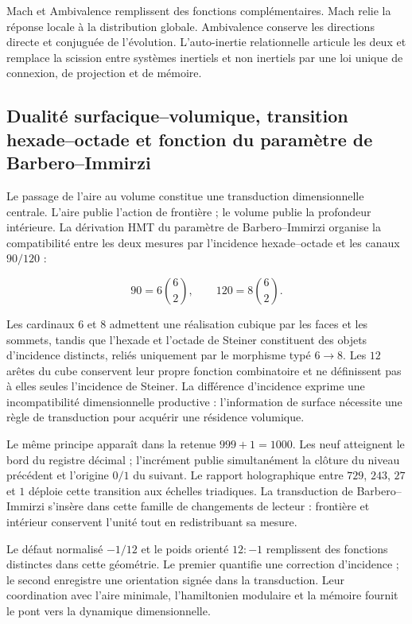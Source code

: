 Mach et Ambivalence remplissent des fonctions complémentaires. Mach relie la réponse locale à la distribution globale. Ambivalence conserve les directions directe et conjuguée de l'évolution. L'auto-inertie relationnelle articule les deux et remplace la scission entre systèmes inertiels et non inertiels par une loi unique de connexion, de projection et de mémoire.

\subsection{Dualité surfacique--volumique, transition hexade--octade et fonction du paramètre de Barbero--Immirzi}

Le passage de l'aire au volume constitue une transduction dimensionnelle centrale. L'aire publie l'action de frontière ; le volume publie la profondeur intérieure. La dérivation HMT du paramètre de Barbero–Immirzi organise la compatibilité entre les deux mesures par l'incidence hexade–octade et les canaux \(90/120\) :

\[
90=6\binom62,
\qquad
120=8\binom62.
\]

Les cardinaux \(6\) et \(8\) admettent une réalisation cubique par les faces et les sommets, tandis que l'hexade et l'octade de Steiner constituent des objets d'incidence distincts, reliés uniquement par le morphisme typé \(6\to8\). Les \(12\) arêtes du cube conservent leur propre fonction combinatoire et ne définissent pas à elles seules l'incidence de Steiner. La différence d'incidence exprime une incompatibilité dimensionnelle productive : l'information de surface nécessite une règle de transduction pour acquérir une résidence volumique.

Le même principe apparaît dans la retenue \(999+1=1000\). Les neuf atteignent le bord du registre décimal ; l'incrément publie simultanément la clôture du niveau précédent et l'origine \(0/1\) du suivant. Le rapport holographique entre \(729\), \(243\), \(27\) et \(1\) déploie cette transition aux échelles triadiques. La transduction de Barbero–Immirzi s'insère dans cette famille de changements de lecteur : frontière et intérieur conservent l'unité tout en redistribuant sa mesure.

Le défaut normalisé \(-1/12\) et le poids orienté \(12:-1\) remplissent des fonctions distinctes dans cette géométrie. Le premier quantifie une correction d'incidence ; le second enregistre une orientation signée dans la transduction. Leur coordination avec l'aire minimale, l'hamiltonien modulaire et la mémoire fournit le pont vers la dynamique dimensionnelle.

